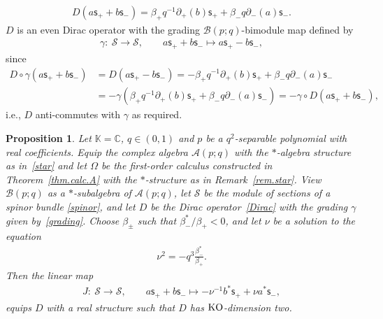 \documentclass[10pt,a4paper]{amsart}
\numberwithin{equation}{section}
\newtheorem{Proposition}[Theorem]{Proposition}
{ \theoremstyle{definition}
\newtheorem{Definition}[Theorem]{Definition}
\newtheorem{Example}[Theorem]{Example}
\newtheorem{Remark}[Theorem]{Remark} }
\def\Weyl#1#2{{\mathcal{B}}(#1;#2)}
\def\AWeyl#1#2{{\mathcal{A}}(#1;#2)}
\begin{document}
\begin{gather}\label{Dirac}
D(a {\mathsf{s}}_+ + b {\mathsf{s}}_-) = \beta_+ q^{-1}\partial_+(b) {\mathsf{s}}_+ + \beta_- q \partial_-(a) {\mathsf{s}}_- .
\end{gather}
$D$ is an even Dirac operator with the grading $\Weyl p q$-bimodule map def\/ined by
\begin{gather}\label{grading}
\gamma\colon \ \mathcal{S} \to \mathcal{S}, \qquad a {\mathsf{s}}_+ + b {\mathsf{s}}_- \longmapsto a {\mathsf{s}}_+ - b {\mathsf{s}}_-,
\end{gather}
since
\begin{align*}
D\circ \gamma (a {\mathsf{s}}_++b {\mathsf{s}}_-) &= D(a {\mathsf{s}}_+-b {\mathsf{s}}_-) = -\beta_+ q^{-1}\partial_+(b) {\mathsf{s}}_+ + \beta_- q \partial_-(a) {\mathsf{s}}_-\\
& = -\gamma(\beta_+ q^{-1}\partial_+(b) {\mathsf{s}}_+ + \beta_- q \partial_-(a) {\mathsf{s}}_-) = - \gamma\circ D(a {\mathsf{s}}_++b {\mathsf{s}}_-),
\end{align*}
i.e., $D$ anti-commutes with $\gamma$ as required.

\begin{Proposition}\label{prop.real}
Let ${\mathbb K} = {\mathbb C}$, $q\in (0,1)$ and $p$ be a $q^2$-separable polynomial with real coefficients. Equip the complex algebra $\AWeyl p q$ with the $*$-algebra structure as in~\eqref{star} and let $\Omega$ be the first-order calculus constructed in Theorem~{\rm \ref{thm.calc.A}} with the $*$-structure as in Remark~{\rm \ref{rem.star}}. View $\Weyl p q$ as a $*$-subalgebra of $\AWeyl p q$, let $\mathcal{S}$ be the module of sections of a spinor bundle \eqref{spinor}, and let $D$ be the Dirac operator~\eqref{Dirac} with the grading $\gamma$ given by~\eqref{grading}. Choose $\beta_\pm$ such that $\beta_-^*/\beta_+<0$, and let $\nu$ be a solution to
the equation
\begin{gather}\label{constraint}
\nu^2 = -q^3\frac{\beta_-^*}{\beta_+}.
\end{gather}
Then the linear map
\begin{gather*}%
J \colon \ \mathcal{S} \to \mathcal{S}, \qquad a {\mathsf{s}}_++b {\mathsf{s}}_- \longmapsto -\nu^{-1} b^*{\mathsf{s}}_+ + \nu a^*{\mathsf{s}}_-,
\end{gather*}
equips $D$ with a real structure such that $D$ has ${\rm KO}$-dimension two.
\end{Proposition}
\end{document}
